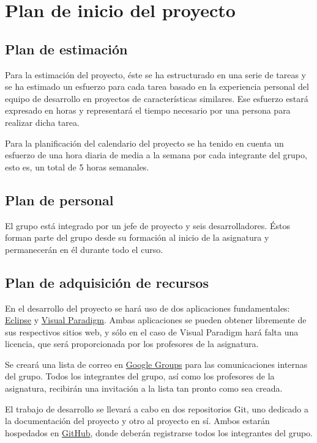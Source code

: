 \section{Plan de inicio del proyecto}

\subsection{Plan de estimación}

Para la estimación del proyecto, éste se ha estructurado en una serie de tareas
y se ha estimado un esfuerzo para cada tarea basado en la experiencia personal
del equipo de desarrollo en proyectos de características similares. Ese esfuerzo
estará expresado en horas y representará el tiempo necesario por una persona
para realizar dicha tarea.

Para la planificación del calendario del proyecto se ha tenido en cuenta un
esfuerzo de una hora diaria de media a la semana por cada integrante del grupo,
esto es, un total de 5 horas semanales.

\subsection{Plan de personal}

El grupo está integrado por un jefe de proyecto y seis desarrolladores. Éstos
forman parte del grupo desde su formación al inicio de la asignatura y
permanecerán en él durante todo el curso.

\subsection{Plan de adquisición de recursos}

En el desarrollo del proyecto se hará uso de dos aplicaciones fundamentales:
\href{http://www.eclipse.org}{Eclipse} y
\href{http://www.visual-paradigm.com}{Visual Paradigm}.
Ambas aplicaciones se pueden obtener libremente de sus respectivos sitios web,
y sólo en el caso de Visual Paradigm hará falta una licencia, que será
proporcionada por los profesores de la asignatura.

Se creará una lista de correo en \href{http://groups.google.com}{Google Groups}
para las comunicaciones internas del grupo. Todos los integrantes del grupo,
así como los profesores de la asignatura, recibirán una invitación a la lista
tan pronto como sea creada.

El trabajo de desarrollo se llevará a cabo en dos repositorios Git, uno dedicado
a la documentación del proyecto y otro al proyecto en sí. Ambos estarán
hospedados en \href{http://github.com}{GitHub}, donde deberán registrarse todos
los integrantes del grupo.

